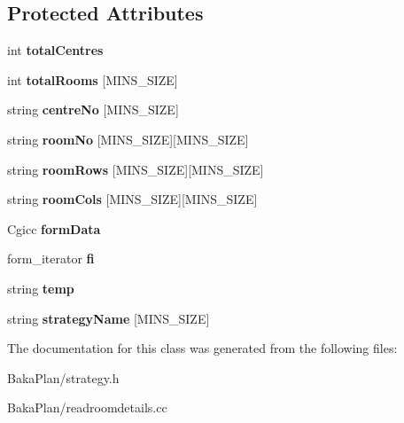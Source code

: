 \subsection*{Protected Attributes}
\begin{DoxyCompactItemize}
\item 
\hypertarget{classReadRoomDetails_aa129e39384751672b59549d8157208a3}{int {\bfseries total\-Centres}}\label{classReadRoomDetails_aa129e39384751672b59549d8157208a3}

\item 
\hypertarget{classReadRoomDetails_ace321366b4a5a91343476cf2c3918eda}{int {\bfseries total\-Rooms} \mbox{[}M\-I\-N\-S\-\_\-\-S\-I\-Z\-E\mbox{]}}\label{classReadRoomDetails_ace321366b4a5a91343476cf2c3918eda}

\item 
\hypertarget{classReadRoomDetails_a7d3fe4925d9d1d61cd1203252fa9520a}{string {\bfseries centre\-No} \mbox{[}M\-I\-N\-S\-\_\-\-S\-I\-Z\-E\mbox{]}}\label{classReadRoomDetails_a7d3fe4925d9d1d61cd1203252fa9520a}

\item 
\hypertarget{classReadRoomDetails_a6b961c05b5c5980de07caec15b25f586}{string {\bfseries room\-No} \mbox{[}M\-I\-N\-S\-\_\-\-S\-I\-Z\-E\mbox{]}\mbox{[}M\-I\-N\-S\-\_\-\-S\-I\-Z\-E\mbox{]}}\label{classReadRoomDetails_a6b961c05b5c5980de07caec15b25f586}

\item 
\hypertarget{classReadRoomDetails_a751d5a539f14f7b1541f24add1a14a8d}{string {\bfseries room\-Rows} \mbox{[}M\-I\-N\-S\-\_\-\-S\-I\-Z\-E\mbox{]}\mbox{[}M\-I\-N\-S\-\_\-\-S\-I\-Z\-E\mbox{]}}\label{classReadRoomDetails_a751d5a539f14f7b1541f24add1a14a8d}

\item 
\hypertarget{classReadRoomDetails_ac9515b760d3bab39cac3673cd276042b}{string {\bfseries room\-Cols} \mbox{[}M\-I\-N\-S\-\_\-\-S\-I\-Z\-E\mbox{]}\mbox{[}M\-I\-N\-S\-\_\-\-S\-I\-Z\-E\mbox{]}}\label{classReadRoomDetails_ac9515b760d3bab39cac3673cd276042b}

\item 
\hypertarget{classReadRoomDetails_a38c9a8165ce1c8078e7843d44a1ba579}{Cgicc {\bfseries form\-Data}}\label{classReadRoomDetails_a38c9a8165ce1c8078e7843d44a1ba579}

\item 
\hypertarget{classReadRoomDetails_a692d9310d1600a6e3bd6cb13247f5ce9}{form\-\_\-iterator {\bfseries fi}}\label{classReadRoomDetails_a692d9310d1600a6e3bd6cb13247f5ce9}

\item 
\hypertarget{classReadRoomDetails_a9d88537ba17a59fb1b1fd54730867969}{string {\bfseries temp}}\label{classReadRoomDetails_a9d88537ba17a59fb1b1fd54730867969}

\item 
\hypertarget{classReadRoomDetails_af3be33bcb331aeca2637e920eced2732}{string {\bfseries strategy\-Name} \mbox{[}M\-I\-N\-S\-\_\-\-S\-I\-Z\-E\mbox{]}}\label{classReadRoomDetails_af3be33bcb331aeca2637e920eced2732}

\end{DoxyCompactItemize}


The documentation for this class was generated from the following files\-:\begin{DoxyCompactItemize}
\item 
Baka\-Plan/strategy.\-h\item 
Baka\-Plan/readroomdetails.\-cc\end{DoxyCompactItemize}
